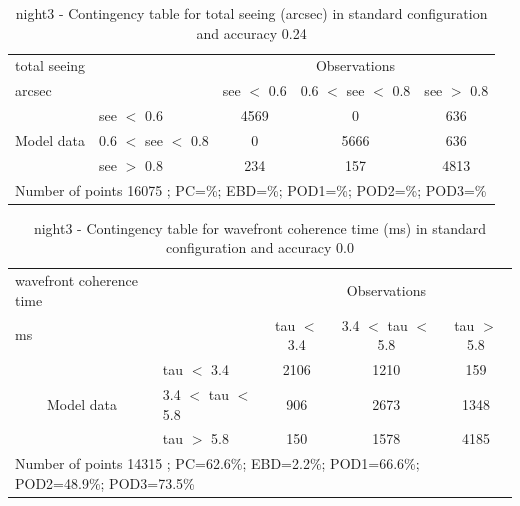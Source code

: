 \begin{table}[p!]
\begin{center}
\begin{tabular}{llccc}
\hline
{total seeing}                                       &                                                    & \multicolumn{3}{c}{Observations}                 \\
{arcsec}                                       &                             & see $<$ 0.6   & 0.6 $<$ see $<$ 0.8 & see $>$ 0.8 \\
\hline
\multicolumn{1}{c}{\multirow{3}{*}{Model data}}  & see $<$ 0.6             & 4569                & 0                       & 636              \\
                                                 & 0.6  $<$ see $<$ 0.8 & 0                & 5666                       & 636              \\
                                                 & see $>$ 0.8             & 234                & 157                       & 4813              \\
\hline
\multicolumn{5}{l}{ Number of points        16075 ; PC=\%; EBD=\%; POD1=\%; POD2=\%; POD3=\%}
\end{tabular}
\end{center}
\caption{night3 - Contingency table for  total seeing (arcsec) in standard configuration and accuracy 0.24}
\label{tab:contingencyseeBEF:night3}
\end{table}
\clearpage
\begin{table}[p!]
\begin{center}
\begin{tabular}{llccc}
\hline
{wavefront coherence time}                                       &                                                    & \multicolumn{3}{c}{Observations}                 \\
{ms}                                       &                             & tau $<$ 3.4   & 3.4 $<$ tau $<$ 5.8 & tau $>$ 5.8 \\
\hline
\multicolumn{1}{c}{\multirow{3}{*}{Model data}}  & tau $<$ 3.4             & 2106                & 1210                       & 159              \\
                                                 & 3.4  $<$ tau $<$ 5.8 & 906                & 2673                       & 1348              \\
                                                 & tau $>$ 5.8             & 150                & 1578                       & 4185              \\
\hline
\multicolumn{5}{l}{ Number of points        14315 ; PC=62.6\%; EBD=2.2\%; POD1=66.6\%; POD2=48.9\%; POD3=73.5\%}
\end{tabular}
\end{center}
\caption{night3 - Contingency table for  wavefront coherence time (ms) in standard configuration and accuracy 0.0}
\label{tab:contingencytauBEF:night3}
\end{table}
